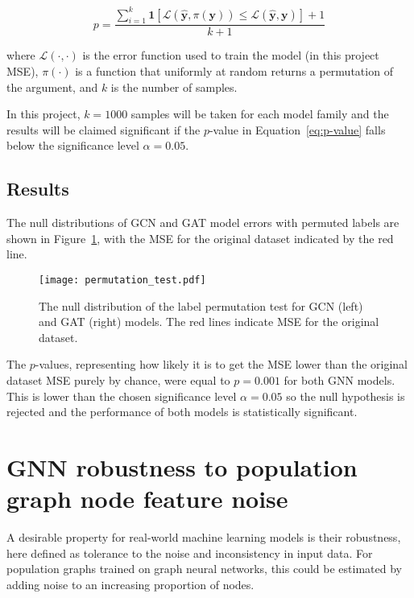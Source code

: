 \begin{equation}
    p = \frac{\sum_{i=1}^k \mathbf{1}\left[\mathcal{L}(\mathbf{\hat{y}}, \pi(\mathbf{y})) \leq \mathcal{L}(\mathbf{\hat{y}}, \mathbf{y})\right] + 1}{k+1}\label{eq:p-value}
\end{equation}

where $\mathcal{L}(\cdot, \cdot)$ is the error function used to train the model (in this project MSE), $\pi(\cdot)$ is a function that uniformly at random returns a permutation of the argument, and $k$ is the number of samples.

In this project, $k=1000$ samples will be taken for each model family and the results will be claimed significant if the $p$-value in Equation~\eqref{eq:p-value} falls below the significance level $\alpha=0.05$. 

\subsection{Results}
The null distributions of GCN and GAT model errors with permuted labels are shown in Figure~\ref{figure:permutation-test}, with the MSE for the original dataset indicated by the red line.

\begin{figure}[h]
    \centering
    \texttt{[image: permutation\_test.pdf]}
    \caption{The null distribution of the label permutation test for GCN (left) and GAT (right) models. The red lines indicate MSE for the original dataset.}\label{figure:permutation-test}
\end{figure}

The $p$-values, representing how likely it is to get the MSE lower than the original dataset MSE purely by chance, were equal to $p=0.001$ for both GNN models. This is lower than the chosen significance level $\alpha=0.05$ so the null hypothesis is rejected and the performance of both models is statistically significant.


\section{GNN robustness to population graph node feature noise}
\label{section:node-noise}
A desirable property for real-world machine learning models is their robustness, here defined as tolerance to the noise and inconsistency in input data.
For population graphs trained on graph neural networks, this could be estimated by adding noise to an increasing proportion of nodes. 

